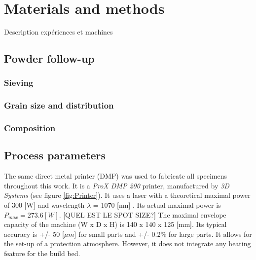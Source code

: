 \chapter{Materials and methods}
\label{Chap3}
Description expériences et machines
\section{Powder follow-up}

\subsection{Sieving}

\subsection{Grain size and distribution}

\subsection{Composition}


\section{Process parameters}
The same direct metal printer (DMP) was used to fabricate all specimens throughout this work. It is a \textit{ProX DMP 200} printer, manufactured by \textit{3D Systems} (see figure \ref{fig:Printer}). It uses a laser with a theoretical maximal power of 300 [W] and wavelength $\lambda$ = 1070 [nm] \parencite{3D}. Its actual maximal power is $P_{max}=273.6 [W]$. [QUEL EST LE SPOT SIZE?]  The maximal envelope capacity of the machine (W x D x H) is 140 x 140 x 125 [mm]. Its typical accuracy is +/- 50 [$\mu m$] for small parts and +/- 0.2\% for large parts. It allows for the set-up of a protection atmosphere. However, it does not integrate any heating feature for the build bed.\\


